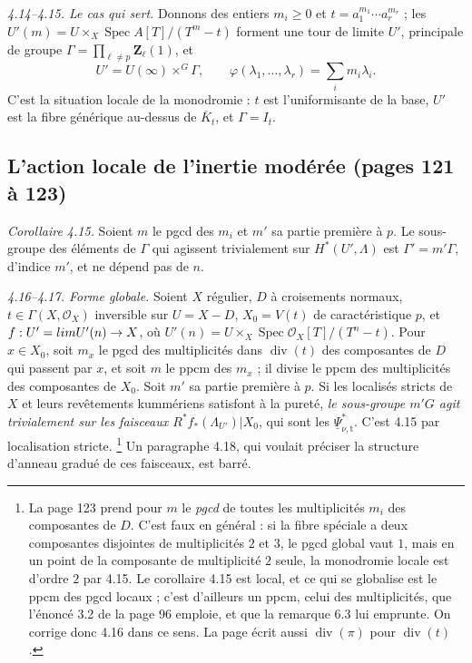 \documentclass[11pt,a4paper]{article}
\begin{document}
\emph{4.14--4.15. Le cas qui sert.} Donnons des entiers $m_i \geq 0$ et
$t = a_1^{m_1} \cdots a_r^{m_r}$ ; les $U'(m) = U \times_X \operatorname{Spec}
A[T]/(T^m - t)$ forment une tour de limite $U'$, principale de groupe
$\Gamma = \prod_{\ell \neq p} \mathbf{Z}_\ell(1)$, et
\[
  U' = U(\infty) \times^G \Gamma, \qquad
  \varphi(\lambda_1, \ldots, \lambda_r) = \textstyle\sum_i m_i \lambda_i .
\]
C'est la situation locale de la monodromie : $t$ est l'uniformisante de la base,
$U'$ est la fibre générique au-dessus de $\overline K_t$, et $\Gamma = I_t$.

\subsection*{L'action locale de l'inertie modérée (pages 121 à 123)}

\emph{Corollaire 4.15.} Soient $m$ le pgcd des $m_i$ et $m'$ sa partie première à
$p$. Le sous-groupe des éléments de $\Gamma$ qui agissent trivialement sur
$H^*(U', \Lambda)$ est $\Gamma' = m'\Gamma$, d'indice $m'$, et ne dépend pas de
$n$.

\emph{4.16--4.17. Forme globale.} Soient $X$ régulier, $D$ à croisements normaux,
$t \in \Gamma(X, \mathcal{O}_X)$ inversible sur $U = X - D$, $X_0 = V(t)$ de
caractéristique $p$, et $f : U' = \varprojlim U'(n) \to X$, où
$U'(n) = U \times_X \operatorname{Spec}\mathcal{O}_X[T]/(T^n - t)$. Pour
$x \in X_0$, soit $m_x$ le pgcd des multiplicités dans $\operatorname{div}(t)$ des
composantes de $D$ qui passent par $x$, et soit $m$ le ppcm des $m_x$ ; il
divise le ppcm des multiplicités des composantes de $X_0$. Soit $m'$ sa partie
première à $p$. Si les localisés stricts de $X$ et leurs revêtements kummériens
satisfont à la pureté, \emph{le sous-groupe $m'G$ agit trivialement sur les
faisceaux $R^*f_*(\Lambda_{U'})|X_0$}, qui sont les
$\underline\Psi^*_{\nu,\mathrm{t}}$. C'est 4.15 par localisation stricte.
\footnote{La page 123 prend pour $m$ le \emph{pgcd} de toutes les multiplicités
$m_i$ des composantes de $D$. C'est faux en général : si la fibre spéciale a deux
composantes disjointes de multiplicités $2$ et $3$, le pgcd global vaut $1$, mais
en un point de la composante de multiplicité $2$ seule, la monodromie locale est
d'ordre $2$ par 4.15. Le corollaire 4.15 est local, et ce qui se globalise est le
ppcm des pgcd locaux ; c'est d'ailleurs un ppcm, celui des multiplicités, que
l'énoncé 3.2 de la page 96 emploie, et que la remarque 6.3 lui emprunte. On
corrige donc 4.16 dans ce sens. La page écrit aussi $\operatorname{div}(\pi)$ pour
$\operatorname{div}(t)$.} Un paragraphe 4.18, qui voulait préciser la structure
d'anneau gradué de ces faisceaux, est barré.
\end{document}
